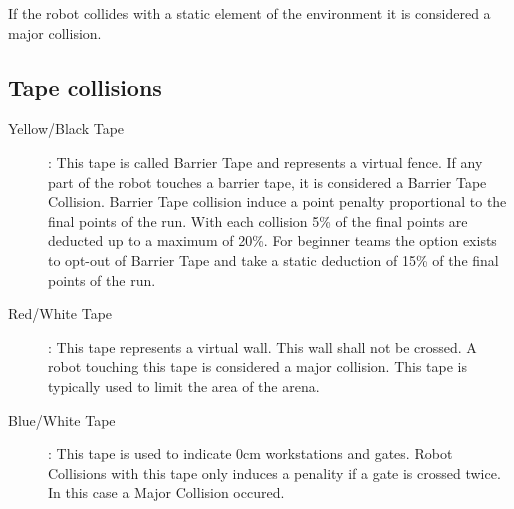 If the robot collides with a static element of the environment it is considered a major collision.

\subsection{Tape collisions}

\begin{description}
  \item[Yellow/Black Tape]: This tape is called Barrier Tape and represents a virtual fence. If any part of the robot
  touches a barrier tape, it is considered a Barrier Tape Collision. Barrier Tape collision induce a point penalty
  proportional to the final points of the run. With each collision 5\% of the final points are deducted up to a maximum
  of 20\%. For beginner teams the option exists to opt-out of Barrier Tape and take a static deduction of 15\% of the
  final points of the run.
  \item[Red/White Tape]: This tape represents a virtual wall. This wall shall not be crossed. A robot touching this
  tape is considered a major collision. This tape is typically used to limit the area of the arena.
  \item[Blue/White Tape]: This tape is used to indicate 0cm workstations and gates. Robot Collisions with this tape
  only induces a penality if a gate is crossed twice. In this case a Major Collision occured.
\end{description}

